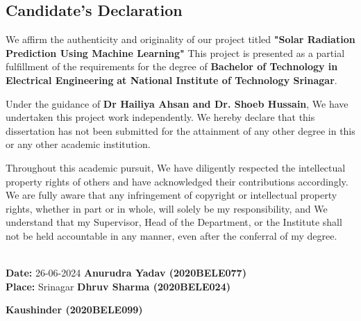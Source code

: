\documentclass[12pt,a4paper]{report}
\begin{document}
   \clearpage
\begin{center}
	\noindent{\rule{\textwidth}{1.0pt}}
	\section*{Candidate's Declaration}
	\noindent{\rule{\textwidth}{1.0pt}}
\end{center}
\vspace{50pt}
We affirm the authenticity and originality of our project titled \textbf{ "Solar Radiation Prediction Using Machine Learning"} This project is presented as a partial fulfillment of the requirements for the degree of \textbf{Bachelor of Technology in Electrical Engineering}\textbf{ at National Institute of Technology Srinagar}.

Under the guidance of \textbf{Dr Hailiya Ahsan and  Dr. Shoeb Hussain}, We have undertaken this project work independently. We hereby declare that this dissertation has not been submitted for the attainment of any other degree in this or any other academic institution.

Throughout this academic pursuit, We have diligently respected the intellectual property rights of others and have acknowledged their contributions accordingly. We are fully aware that any infringement of copyright or intellectual property rights, whether in part or in whole, will solely be my responsibility, and We understand that my Supervisor, Head of the Department, or the Institute shall not be held accountable in any manner, even after the conferral of my degree.\\
\vspace{30pt}\\
\begin{flushright}
	
\end{flushright}
		\noindent \textbf{Date:} {26-06-2024}  \hfill \textbf{Anurudra Yadav (2020BELE077)}\\ \noindent \textbf{Place:} {Srinagar} \hfill \textbf{ Dhruv Sharma (2020BELE024)}
  
		  \hfill \noindent \textbf{  Kaushinder (2020BELE099)}
		
\end{document}
